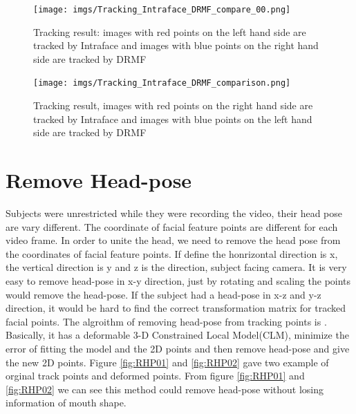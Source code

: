 \begin{figure}
\centering
\texttt{[image: imgs/Tracking\_Intraface\_DRMF\_compare\_00.png]}
\caption{Tracking result: images with red points on the left hand side are tracked by Intraface and images with blue points on the right hand side are tracked by DRMF}
\label{fig:cmp01}
\texttt{[image: imgs/Tracking\_Intraface\_DRMF\_comparison.png]}
\caption{Tracking result, images with red points on the right hand side are tracked by Intraface and images with blue points on the left hand side are tracked by DRMF}
\label{fig:cmp02}
\end{figure}
\newpage
\section{Remove Head-pose}
Subjects were unrestricted while they were recording the video, their head pose are vary different. The coordinate of facial feature points are different for each video frame. In order to unite the head, we need to remove the head pose from the coordinates of facial feature points.  If define the honrizontal direction is x, the vertical direction is y and z is the direction, subject facing camera. It is very easy to remove head-pose in x-y direction, just by rotating and scaling the points would remove the head-pose. If the subject had a head-pose in x-z and y-z direction, it would be hard to find the correct transformation matrix for tracked facial points. The algroithm of removing head-pose from tracking points is \cite{saragih2011deformable}. Basically, it has a deformable 3-D Constrained Local Model(CLM), minimize the error of fitting the model and the 2D points and then remove head-pose and give the new 2D points. Figure \ref{fig:RHP01} and \ref{fig:RHP02} gave two example of orginal track points and deformed points. From figure \ref{fig:RHP01} and \ref{fig:RHP02} we can see this method could remove head-pose without losing information of mouth shape.
